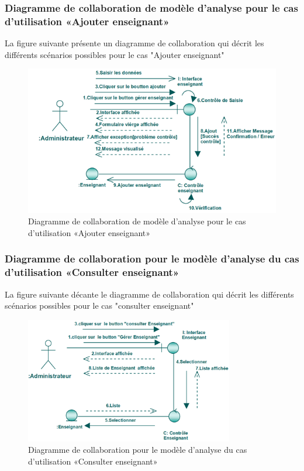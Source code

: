 \documentclass[12 pt ]{report}
\begin{document}
\subsubsection{Diagramme  de  collaboration  de  modèle  d'analyse  pour  le  cas  d'utilisation «Ajouter enseignant»  }
La figure suivante présente un diagramme de collaboration qui décrit les différents
scénarios possibles pour le cas "Ajouter enseignant"
\begin{figure}[h]
\begin{center}
\includegraphics[width= 14 cm , height =5.5 cm]{collaajoutens.png}
 \caption{Diagramme  de  collaboration  de  modèle  d'analyse  pour  le  cas  d'utilisation «Ajouter enseignant»}
\end{center}
\end{figure}
\subsubsection{Diagramme de collaboration pour le modèle d’analyse du cas d'utilisation                                       «Consulter enseignant»}
La figure suivante décante le diagramme de collaboration qui décrit les différents
scénarios possibles pour le cas "consulter enseignant"
\begin{figure}[h]
 \begin{center}
\includegraphics[width= 14 cm ,height=5.5cm]{collaconsens.PNG}
\caption{Diagramme de collaboration pour le modèle d’analyse du cas d'utilisation                                       «Consulter enseignant»}

\end{center}
\end{figure}
\end{document}
